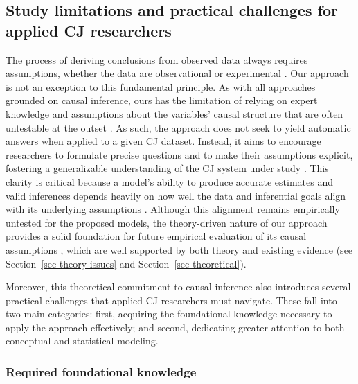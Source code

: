 \documentclass[
  authoryear,
  review,
  1p]{elsarticle}
\begin{document}
\subsection{Study limitations and practical challenges for applied CJ
researchers}\label{sec-discussion_challenges}

The process of deriving conclusions from observed data always requires
assumptions, whether the data are observational or experimental
\citep{Kohler_et_al_2019, Deffner_et_al_2022}. Our approach is not an
exception to this fundamental principle. As with all approaches grounded
on causal inference, ours has the limitation of relying on expert
knowledge and assumptions about the variables' causal structure that are
often untestable at the outset \citep{Hernan_et_al_2025}. As such, the
approach does not seek to yield automatic answers when applied to a
given CJ dataset. Instead, it aims to encourage researchers to formulate
precise questions and to make their assumptions explicit, fostering a
generalizable understanding of the CJ system under study
\citep{Rohrer_et_al_2022, Deffner_et_al_2022, Sterner_et_al_2024}. This
clarity is critical because a model's ability to produce accurate
estimates and valid inferences depends heavily on how well the data and
inferential goals align with its underlying assumptions
\citep{Kohler_et_al_2019}. Although this alignment remains empirically
untested for the proposed models, the theory-driven nature of our
approach provides a solid foundation for future empirical evaluation of
its causal assumptions \citep{Deffner_et_al_2022}, which are well
supported by both theory and existing evidence (see
Section~\ref{sec-theory-issues} and Section~\ref{sec-theoretical}).

Moreover, this theoretical commitment to causal inference also
introduces several practical challenges that applied CJ researchers must
navigate. These fall into two main categories: first, acquiring the
foundational knowledge necessary to apply the approach effectively; and
second, dedicating greater attention to both conceptual and statistical
modeling.

\subsubsection{Required foundational
knowledge}\label{sec-discussion_challenges1}
\end{document}
